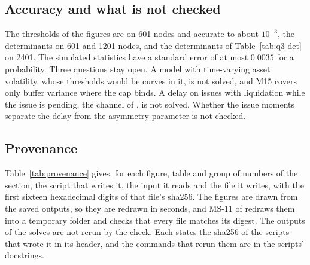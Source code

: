 \subsection{Accuracy and what is not checked}
\label{sec:cs-accuracy}

The thresholds of the figures are on 601 nodes and accurate to about
$10^{-3}$, the determinants on 601 and 1201 nodes, and the determinants of
Table~\ref{tab:q3-det} on 2401. The simulated statistics have a standard error
of at most $0.0035$ for a probability. Three questions stay open. A model with
time-varying asset volatility, whose thresholds would be curves in it, is not
solved, and M15 covers only buffer variance where the cap binds. A delay on
issues with liquidation while the issue is pending, the channel of
\citet{peura2006}, is not solved. Whether the issue moments separate the delay
from the asymmetry parameter is not checked.

\subsection{Provenance}
\label{sec:cs-provenance}

Table~\ref{tab:provenance} gives, for each figure, table and group of numbers
of the section, the script that writes it, the input it reads and the file it
writes, with the first sixteen hexadecimal digits of that file's sha256. The
figures are drawn from the saved outputs, so they are redrawn in seconds, and
MS-11 of  redraws them into a
temporary folder and checks that every file matches its digest. The outputs
of the solves are not rerun by the check. Each states the sha256 of the
scripts that wrote it in its header, and the commands that rerun them are in
the scripts' docstrings.


